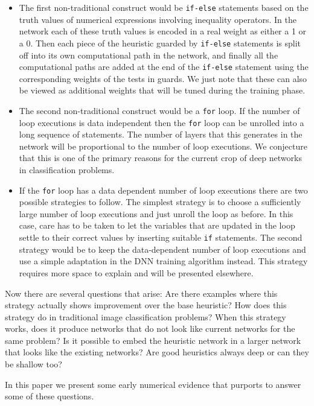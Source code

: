 \documentclass{article}
\begin{document}
\begin{itemize}
\item The first non-traditional construct would be \texttt{if-else} statements based on the truth values of numerical expressions involving inequality operators. In the network each of these truth values is encoded in a real weight as either a 1 or a 0. Then each piece of the heuristic guarded by \texttt{if-else} statements is split off into its own computational path in the network, and finally all the computational paths are added at the end of the \texttt{if-else} statement using the corresponding weights of the tests in guards. We just note that these can also be viewed as additional weights that will be tuned during the training phase.

\item The second non-traditional construct would be a \texttt{for} loop. If the number of loop executions is data independent then the \texttt{for} loop can be unrolled into a long sequence of statements. The number of layers that this generates in the network will be proportional to the number of loop executions. We conjecture that this is one of the primary reasons for the current crop of deep networks in classification problems.

\item If the \texttt{for} loop has a data dependent number of loop executions there are two possible strategies to follow. The simplest strategy is to choose a sufficiently large number of loop executions and just unroll the loop as before. In this case, care has to be taken to let the variables that are updated in the loop settle to their correct values by inserting suitable \texttt{if} statements. The second strategy would be to keep the data-dependent number of loop executions and use a simple adaptation in the DNN training algorithm instead. This strategy requires more space to explain and will be presented elsewhere.
\end{itemize}


Now there are several questions that arise: Are there examples where this strategy actually shows improvement over the base heuristic? How does this strategy do in traditional image classification problems? When this strategy works, does it produce networks that do not look like current networks for the same problem? Is it possible to embed the heuristic network in a larger network that looks like the existing networks? Are good heuristics always deep or can they be shallow too?


In this paper we present some early numerical evidence that purports to answer some of these questions.
\end{document}
